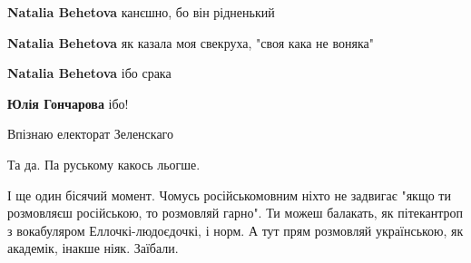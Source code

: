 \begin{itemize}
\begin{itemize}
\textbf{Natalia Behetova} канєшно, бо він рідненький

 
\textbf{Natalia Behetova} як казала моя свекруха, "своя кака не воняка"

 
\textbf{Natalia Behetova} ібо срака

 
\textbf{Юлія Гончарова} ібо!
\end{itemize}

 
Впізнаю електорат Зеленскаго


Та да. Па руському какось льогше.

І ще один бісячий момент. Чомусь російськомовним ніхто не задвигає "якщо ти
розмовляєш російською, то розмовляй гарно". Ти можеш балакать, як пітекантроп з
вокабуляром Еллочкі-людоєдочкі, і норм. А тут прям розмовляй українською, як
академік, інакше ніяк. Заїбали.

\begin{itemize}
 

\end{itemize}
\end{itemize}
